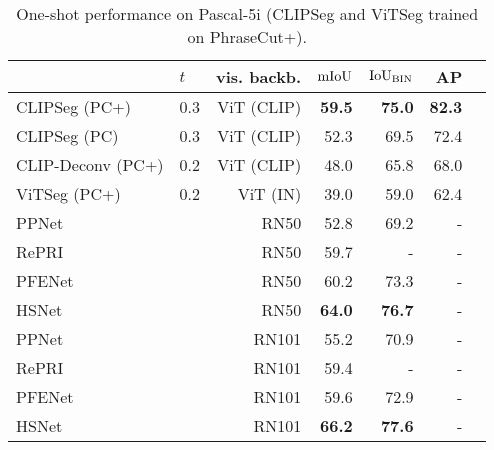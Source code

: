 \documentclass[10pt,twocolumn,letterpaper]{article}
\begin{document}
\begin{table}[t]
    \centering
    \footnotesize
    \begin{tabular}{llrrrrr}
         \toprule
        & $t$ & vis. backb. & $\text{mIoU}$ & $\text{IoU}_{\text{BIN}}$ &  AP \\
        \midrule
CLIPSeg (PC+) & 0.3 & ViT (CLIP) & \textbf{59.5} & \textbf{75.0} & \textbf{82.3} \\
CLIPSeg (PC)  & 0.3 & ViT (CLIP) & 52.3 & 69.5 & 72.4 \\
CLIP-Deconv (PC+) & 0.2 & ViT (CLIP) & 48.0 & 65.8 & 68.0 \\
ViTSeg (PC+) & 0.2 & ViT (IN) & 39.0 & 59.0 & 62.4 \\
        \midrule
        PPNet  \cite{liu20} & & RN50 & 52.8  & 69.2  & - \\
        RePRI \cite{boudiaf20} & & RN50 & 59.7 & - & -  \\
        PFENet \cite{tian20a} & & RN50 & 60.2  & 73.3 & -  \\
        HSNet \cite{min21hsnet} & & RN50 & \textbf{64.0} & \textbf{76.7} & -\\
        \midrule
        PPNet  \cite{liu20} & & RN101 & 55.2  & 70.9 & -  \\
        RePRI \cite{boudiaf20} & & RN101  & 59.4  & - & - \\
        PFENet \cite{tian20a} & & RN101 & 59.6 & 72.9 & - \\
        HSNet \cite{min21hsnet} & & RN101 & \textbf{66.2} & \textbf{77.6} & - \\
        \bottomrule
         \end{tabular} \caption{One-shot performance on Pascal-5i (CLIPSeg and ViTSeg trained on PhraseCut+).}
    \label{tab:pas5i_oneshot}
\end{table}
\end{document}
